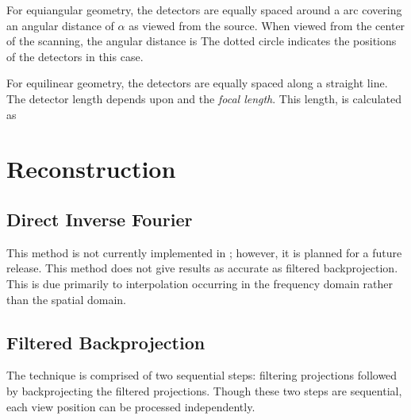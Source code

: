 For equiangular geometry, the detectors are equally spaced around a arc
covering an angular distance of $\alpha$ as viewed from the source. When
viewed from the center of the scanning, the angular distance is
The dotted circle
indicates the positions of the detectors in this case.

\begin{figure}
\centerline{}
\end{figure}

For equilinear geometry, the detectors are equally spaced along a straight
line. The detector length depends upon
\latexonly{$\alpha$} and the \emph{focal
length}. This length,
 is calculated as
\begin{figure}
\centerline{}
\end{figure}


\section{Reconstruction}\label{conceptreconstruction}%

\subsection{Direct Inverse Fourier}
This method is not currently implemented in \ctsim; however, it is
planned for a future release. This method does not give results as
accurate as filtered backprojection. This is due primarily
to interpolation occurring in the frequency domain rather than the
spatial domain.

\subsection{Filtered Backprojection}
The technique is comprised of two sequential steps:
filtering projections followed by backprojecting the filtered projections. Though
these two steps are sequential, each view position can be processed independently.

